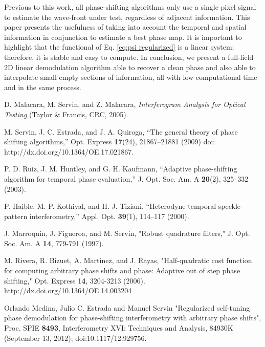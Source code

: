 Previous to this work, all phase-shifting algorithms only use a single pixel
signal to estimate the wave-front under test, regardless of adjacent
information. This paper presents the usefulness of taking into account the
temporal and spatial information in conjunction to estimate a best phase
map. It is important to highlight that the functional of Eq. \eqref{eq:psi
regularized} is a linear system; therefore, it is stable and easy to compute. 
In conclusion, we present a full-field 2D linear demodulation algorithm  able 
to recover a clean phase and also able to interpolate small empty sections of
information, all with low computational time and in the same process.

\begin{thebibliography}{99}

   D. Malacara, M. Servin, and Z. Malacara, 
  \textit{Interferogram Analysis for Optical Testing} (Taylor \& Francis, CRC, 
  2005).
  
  M. Servin, J. C. Estrada, and J. A. Quiroga, “The 
  general theory of phase shifting algorithms,” Opt. Express \textbf{17}(24), 
  21867–21881 (2009) doi: http://dx.doi.org/10.1364/OE.17.021867.
  
  

  
  P. D. Ruiz, J. M. Huntley, and G. H. Kaufmann, “Adaptive phase-shifting 
  algorithm for temporal phase evaluation,” J. Opt. Soc. Am. A \textbf{20}(2), 
  325–332 (2003).
  
  P. Haible, M. P. Kothiyal, and H. J. Tiziani, “Heterodyne temporal 
  speckle-pattern interferometry,” Appl. Opt. \textbf{39}(1), 114–117 (2000).
  
     J. Marroquin, J. Figueroa, and M. Servin, "Robust quadrature
  filters," J. Opt. Soc. Am. A  \textbf{14}, 779-791 (1997).
 
  
   M. Rivera, R. Bizuet, A. Martinez, and J. Rayas,
  "Half-quadratic cost function for computing arbitrary phase shifts and phase:
  Adaptive out of step phase shifting," Opt. Express  1\textbf{4}, 3204-3213
  (2006). http://dx.doi.org/10.1364/OE.14.003204
  
   Orlando Medina, Julio C. Estrada and Manuel Servin 
  "Regularized self-tuning phase demodulation for phase-shifting 
  interferometry with arbitrary phase shifts", Proc. SPIE \textbf{8493},
  Interferometry XVI: Techniques and Analysis, 84930K (September 13, 2012); 
  doi:10.1117/12.929756.
  

\end{thebibliography}

